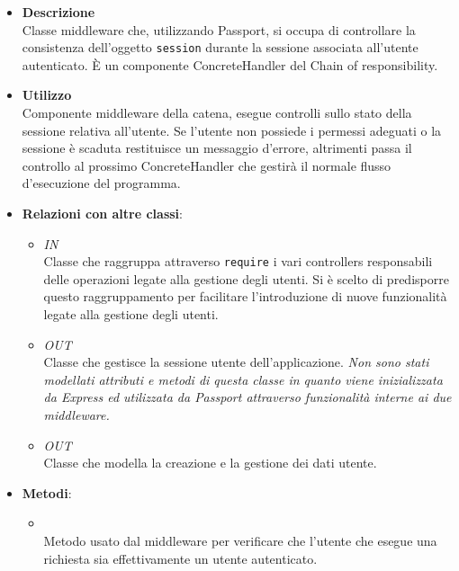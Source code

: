 \begin{itemize}
\item \textbf{Descrizione}\\
Classe middleware che, utilizzando Passport, si occupa di controllare la consistenza dell'oggetto \texttt{session} durante la sessione associata all'utente autenticato.  \`E un componente ConcreteHandler del  Chain of responsibility.
\item \textbf{Utilizzo}\\
Componente middleware della catena, esegue controlli sullo stato della sessione relativa all'utente. Se l'utente non possiede i permessi adeguati o la sessione è scaduta restituisce un messaggio d'errore, altrimenti passa il controllo al prossimo ConcreteHandler che gestirà il normale flusso d'esecuzione del programma.
\item \textbf{Relazioni con altre classi}:
\begin{itemize}
\item \textit{IN} \hyperref[\nogloxy{Premi::Back-End::App::Controllers::UserController}]{}\\
Classe che raggruppa attraverso \texttt{require} i vari controllers responsabili delle operazioni legate alla gestione degli utenti.
Si è scelto di predisporre questo raggruppamento per facilitare l’introduzione di nuove funzionalità legate alla gestione degli utenti.
\item \textit{OUT} \hyperref[\nogloxy{Premi::Back-End::App::Models::Session}]{}\\
Classe che gestisce la sessione utente dell'applicazione. \textit{Non sono stati modellati attributi e metodi di questa classe in quanto viene inizializzata da Express ed utilizzata da Passport attraverso funzionalità interne ai due middleware.}
\item \textit{OUT} \hyperref[\nogloxy{Premi::Back-End::App::Models::UserModel}]{}\\
Classe che modella la creazione e la gestione dei dati utente.
\end{itemize}
\item \textbf{Metodi}:
\begin{itemize}
\item {}
\\ Metodo usato dal middleware per verificare che l'utente che esegue una richiesta sia effettivamente un utente autenticato.

\end{itemize}
\end{itemize}
